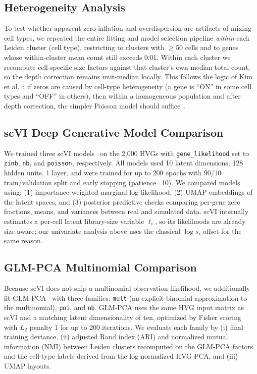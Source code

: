\documentclass{article}
\begin{document}
\subsection{Heterogeneity Analysis}

To test whether apparent zero-inflation and overdispersion are artifacts of mixing cell types, we repeated the entire fitting and model selection pipeline \emph{within} each Leiden cluster (cell type), restricting to clusters with $\geq$50 cells and to genes whose within-cluster mean count still exceeds 0.01.
Within each cluster we recompute cell-specific size factors against that cluster's own median total count, so the depth correction remains unit-median locally.
This follows the logic of Kim et al.~\cite{kim2020demystifying}: if zeros are caused by cell-type heterogeneity (a gene is ``ON'' in some cell types and ``OFF'' in others), then within a homogeneous population and after depth correction, the simpler Poisson model should suffice~\cite{pan2023poisson}.

\subsection{scVI Deep Generative Model Comparison}

We trained three scVI models~\cite{lopez2018deep} on the 2{,}000 HVGs with \texttt{gene\_likelihood} set to \texttt{zinb}, \texttt{nb}, and \texttt{poisson}, respectively.
All models used 10 latent dimensions, 128 hidden units, 1 layer, and were trained for up to 200 epochs with 90/10 train/validation split and early stopping (patience=10).
We compared models using: (1) importance-weighted marginal log-likelihood, (2) UMAP embeddings of the latent spaces, and (3) posterior predictive checks comparing per-gene zero fractions, means, and variances between real and simulated data.
scVI internally estimates a per-cell latent library-size variable $\ell_i$, so its likelihoods are already size-aware; our univariate analysis above uses the classical $\log s_i$ offset for the same reason.

\subsection{GLM-PCA Multinomial Comparison}

Because scVI does not ship a multinomial observation likelihood, we additionally fit GLM-PCA~\cite{townes2019feature} with three families: \texttt{mult} (an explicit binomial approximation to the multinomial), \texttt{poi}, and \texttt{nb}.
GLM-PCA uses the same HVG input matrix as scVI and a matching latent dimensionality of ten, optimized by Fisher scoring with $L_2$ penalty 1 for up to 200 iterations.
We evaluate each family by (i) final training deviance, (ii) adjusted Rand index (ARI) and normalized mutual information (NMI) between Leiden clusters recomputed on the GLM-PCA factors and the cell-type labels derived from the log-normalized HVG PCA, and (iii) UMAP layouts.
\end{document}
